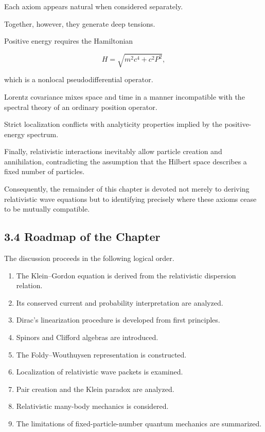 Each axiom appears natural when considered separately.

Together, however, they generate deep tensions.

Positive energy requires the Hamiltonian

\begin{equation}
H
=
\sqrt{m^2c^4+c^2P^2},
\end{equation}

which is a nonlocal pseudodifferential operator.

Lorentz covariance mixes space and time in a manner incompatible with the
spectral theory of an ordinary position operator.

Strict localization conflicts with analyticity properties implied by the
positive-energy spectrum.

Finally, relativistic interactions inevitably allow particle creation and
annihilation, contradicting the assumption that the Hilbert space describes a
fixed number of particles.

Consequently, the remainder of this chapter is devoted not merely to deriving
relativistic wave equations but to identifying precisely where these axioms
cease to be mutually compatible.


\subsection{3.4 Roadmap of the Chapter}

The discussion proceeds in the following logical order.

\begin{enumerate}

\item The Klein--Gordon equation is derived from the relativistic dispersion
relation.

\item Its conserved current and probability interpretation are analyzed.

\item Dirac's linearization procedure is developed from first principles.

\item Spinors and Clifford algebras are introduced.

\item The Foldy--Wouthuysen representation is constructed.

\item Localization of relativistic wave packets is examined.

\item Pair creation and the Klein paradox are analyzed.

\item Relativistic many-body mechanics is considered.

\item The limitations of fixed-particle-number quantum mechanics are
summarized.

\end{enumerate}

